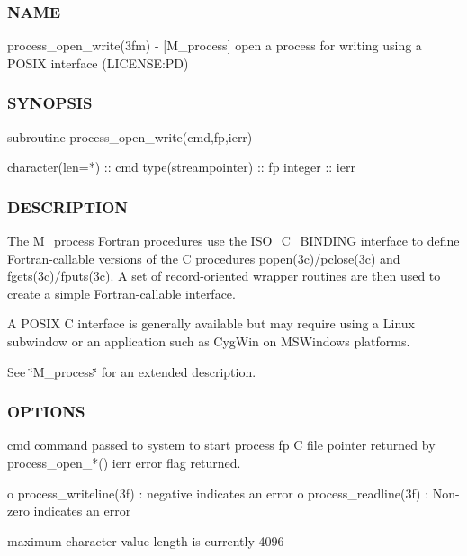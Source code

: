 \subsubsection*{N\+A\+ME}

process\+\_\+open\+\_\+write(3fm) -\/ \mbox{[}M\+\_\+process\mbox{]} open a process for writing using a P\+O\+S\+IX interface (L\+I\+C\+E\+N\+SE\+:PD) 

\subsubsection*{S\+Y\+N\+O\+P\+S\+IS}

\begin{DoxyVerb} subroutine process_open_write(cmd,fp,ierr)

   character(len=*)    :: cmd
   type(streampointer) :: fp
   integer             :: ierr
\end{DoxyVerb}


\subsubsection*{D\+E\+S\+C\+R\+I\+P\+T\+I\+ON}

The M\+\_\+process Fortran procedures use the I\+S\+O\+\_\+\+C\+\_\+\+B\+I\+N\+D\+I\+NG interface to define Fortran-\/callable versions of the C procedures popen(3c)/pclose(3c) and fgets(3c)/fputs(3c). A set of record-\/oriented wrapper routines are then used to create a simple Fortran-\/callable interface.

A P\+O\+S\+IX C interface is generally available but may require using a Linux subwindow or an application such as Cyg\+Win on M\+S\+Windows platforms.

See \char`\"{}\+M\+\_\+process\char`\"{} for an extended description.

\subsubsection*{O\+P\+T\+I\+O\+NS}

\begin{DoxyVerb}cmd      command passed to system to start process
fp       C file pointer returned by process_open_*()
ierr     error flag returned.

          o process_writeline(3f) : negative indicates an error
          o process_readline(3f)  : Non-zero indicates an error

maximum character value length is currently 4096
\end{DoxyVerb}


